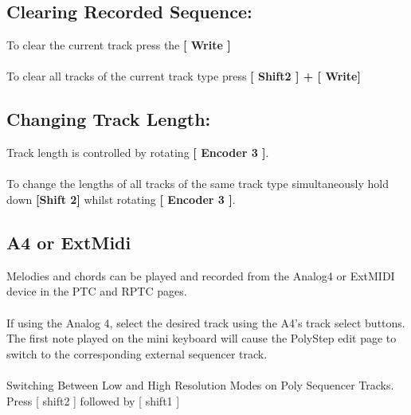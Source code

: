 \subsection{Clearing Recorded Sequence:}
To clear the current track press the \textbf{[ Write ]}\\
\\To clear all tracks of the current track type press \textbf{[ Shift2 ] + [ Write]}
\subsection{Changing Track Length:}
Track length is controlled by rotating \textbf{[ Encoder 3 ]}.\\
\\To change the lengths of all tracks of the same track type simultaneously hold down \textbf{[Shift 2] }whilst rotating \textbf{[ Encoder 3 ]}.

\subsection{A4 or ExtMidi}
Melodies and chords can be played and recorded from the Analog4 or ExtMIDI device in the PTC and RPTC pages.\\
\\
If using the Analog 4, select the desired track using the A4’s track select buttons. The first note played on the mini keyboard will cause the PolyStep edit page to switch to  the corresponding external sequencer track.\\
\\
Switching Between Low and High Resolution Modes on Poly Sequencer Tracks.
Press [ shift2 ] followed by [ shift1 ]

